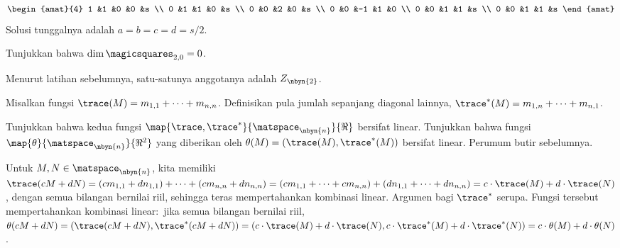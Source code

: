 \begin{exercises}
\begin{answer}
\begin{multline*}
        \begin{amat}{4}
          1  &1  &0  &0  &s  \\
          0  &1  &1  &0  &s  \\          
          0  &0  &2  &0  &s  \\
          0  &0  &-1 &1  &0  \\
          0  &0  &1  &1  &s  \\
          0  &0  &1  &1  &s  
        \end{amat}
      \end{multline*}
      Solusi tunggalnya adalah $a=b=c=d=s/2$.
    \end{answer}
  \item \label{exer:DimTwoMagicSqsMagicSumZero} 
    Tunjukkan bahwa $\dim\magicsquares_{2,0}=0$.
    \begin{answer}
       Menurut latihan sebelumnya, satu-satunya anggotanya adalah
       $Z_{\nbyn{2}}$.
    \end{answer}
  \item   \label{exer:TraceIsLinear}
    Misalkan fungsi 
    $\trace (M)=m_{1,1}+\cdots+m_{n,n}$.
    Definisikan pula jumlah sepanjang diagonal lainnya,
    $\trace^* (M)=m_{1,n}+\cdots+m_{n,1}$.
    \begin{exparts}
      \partsitem 
        Tunjukkan bahwa kedua fungsi
        $\map{\trace,\trace^*}{\matspace_{\nbyn{n}}}{\Re}$
        bersifat linear.
      \partsitem
        Tunjukkan bahwa fungsi
       $\map{\theta}{\matspace_{\nbyn{n}}}{\Re^2}$
       yang diberikan oleh $\theta(M)=(\trace(M),\trace^*(M))$ bersifat linear.
     \partsitem
       Perumum butir sebelumnya.
    \end{exparts}
    \begin{answer}
      \begin{exparts}
        \partsitem
          Untuk $M,N\in\matspace_{\nbyn{n}}$, kita memiliki
          $\trace(cM+dN)=(cm_{1,1}+dn_{1,1})+\cdots+(cm_{n,n}+dn_{n,n})
          =(cm_{1,1}+\cdots+cm_{n,n})+(dn_{1,1}+\cdots+dn_{n,n})
          =c\cdot\trace(M)+d\cdot\trace(N)$, dengan semua bilangan bernilai
          riil, sehingga teras mempertahankan kombinasi linear.
          Argumen bagi $\trace^*$ serupa.
       \partsitem
         Fungsi tersebut mempertahankan kombinasi linear:~jika semua bilangan
         bernilai riil,
          $\theta(cM+dN)=(\trace(cM+dN),\trace^*(cM+dN))
          =(c\cdot\trace(M)+d\cdot\trace(N), c\cdot\trace^*(M)+d\cdot\trace^*(N))
          =c\cdot\theta(M)+d\cdot\theta(N)$.
       \partsitem   

\end{exparts}
\end{answer}
\end{exercises}
